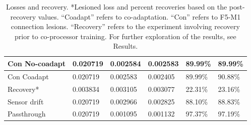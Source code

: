 \documentclass[12pt]{iopart}
\begin{document}
\begin{table}[h]
\begin{tabular}{|l|l|l|l|l|l|}
Con No-coadapt & 0.020719                                                          & 0.002584                                                         & 0.002583                                                             & 89.99\%            & 89.99\%                                                          \\ \hline
Con Coadapt    & 0.020719                                                          & 0.002583                                                         & 0.002405                                                             & 89.99\%            & 90.88\%                                                          \\ \hline
Recovery*      & 0.003834                                                          & 0.003105                                                         & 0.003077                                                             & 22.31\%            & 23.16\%                                                          \\ \hline
Sensor drift   & 0.020719                                                          & 0.002966                                                        & 0.002825                                                              & 88.10\%            & 88.83\%                                                          \\ \hline
Passthrough    & 0.020719                                                          & 0.001095                                                        & 0.001132                                                              & 97.37\%            & 97.19\%                                                          \\ \hline
\end{tabular}
\caption{\label{tab:results}Losses and recovery. *Lesioned loss and percent recoveries based on the post-recovery values.
         ``Coadapt'' refers to co-adaptation. ``Con'' refers to F5-M1 connection lesions. ``Recovery'' refers to the
         experiment involving recovery prior to co-processor training.
         For further exploration of the results, see Results.}
\end{table}
\end{document}
